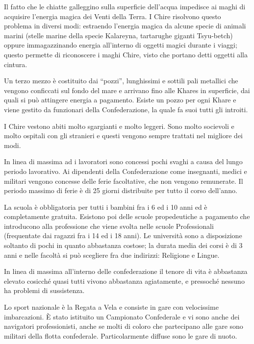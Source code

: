 Il fatto che le chiatte galleggino sulla superficie dell'acqua
impedisce ai maghi di acquisire l'energia magica dei Venti della
Terra. I Chire risolvono questo problema in diversi modi: estraendo
l'energia magica da alcune specie di animali marini (stelle marine
della specie Kalareyna, tartarughe giganti Tsyu-betch) oppure
immagazzinando energia all'interno di oggetti magici durante i viaggi;
questo permette di riconoscere i maghi Chire, visto che portano detti
oggetti alla cintura.

Un terzo mezzo \`e costituito dai ``pozzi'', lunghissimi e sottili
pali metallici che vengono conficcati sul fondo del mare e arrivano
fino alle Khares in superficie, dai quali si pu\`o attingere energia a
pagamento. Esiste un pozzo per ogni Khare e viene gestito da
funzionari della Confederazione, la quale fa suoi tutti gli introiti.

\Moda I Chire vestono abiti molto sgargianti e molto leggeri. Sono
molto socievoli e molto ospitali con gli stranieri e questi vengono
sempre trattati nel migliore dei modi. 

In linea di massima ad i lavoratori sono concessi pochi svaghi a causa
del lungo periodo lavorativo. Ai dipendenti della Confederazione come
insegnanti, medici e militari vengono concesse delle ferie
facoltative, che non vengono remunerate.  Il periodo massimo di ferie
\`e di 25 giorni distribuite per tutto il corso dell'anno.

La scuola \`e obbligatoria per tutti i bambini fra i 6 ed i 10 anni ed
\`e completamente gratuita. Esistono poi delle scuole propedeutiche a
pagamento che introducono alla professione che viene svolta nelle
scuole Professionali (frequentate dai ragazzi fra i 14 ed i 18 anni).
Le universit\`a sono a disposizione soltanto di pochi in quanto
abbastanza costose; la durata media dei corsi \`e di 3 anni e nelle
facolt\`a si pu\`o scegliere fra due indirizzi: Religione e Lingue.

In linea di massima all'interno delle confederazione il tenore di vita \`e
abbastanza elevato cosicch\'e quasi tutti vivono abbastanza agiatamente, e pressoch\'e
nessuno ha problemi di sussistenza. 

Lo sport nazionale \`e la Regata a Vela e consiste in gare con
velocissime imbarcazioni. \`E stato istituito un Campionato Confederale
e vi sono anche dei navigatori professionisti, anche se molti di
coloro che partecipano alle gare sono militari della flotta
confederale. Particolarmente diffuse sono le gare di nuoto.


